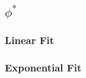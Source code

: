 \documentclass{article}
\begin{document}
	\subsection{$\phi^{*}$}
		\subsubsection{Linear Fit}
		\begin{figure}[ht]
			\begin{center}
				
			\end{center}
		\end{figure}

		\subsubsection{Exponential Fit}
		\begin{figure}[ht]
			\begin{center}
				
			\end{center}
		\end{figure}
\end{document}
